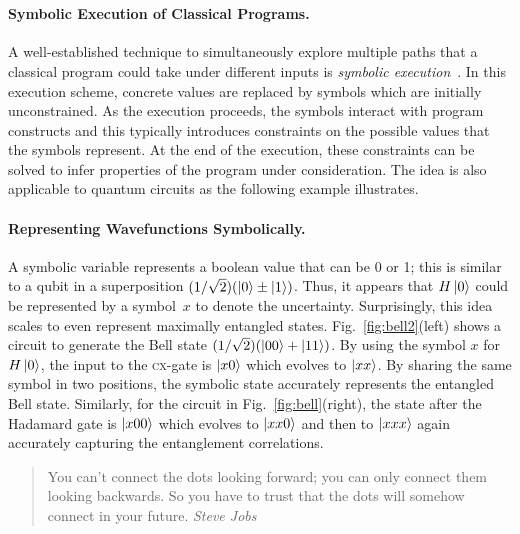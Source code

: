 \documentclass{article}
\newcommand{\cx}{\textsc{cx}}
\begin{document}
\begin{refsection}
{\[\begin{array}{l}
\end{array}\]
}

\paragraph*{Symbolic Execution of Classical Programs.}
A well-established technique to simultaneously explore multiple paths
that a classical program could take under different inputs is
\emph{symbolic
  execution}~\cite{10.1145/390016.808445,10.1145/360248.360252,howden,10.1145/800191.805647,10.1145/3182657}. In
this execution scheme, concrete values are replaced by symbols which are
initially unconstrained. As the execution proceeds, the symbols
interact with program constructs and this typically introduces
constraints on the possible values that the symbols represent. At the
end of the execution, these constraints can be solved to infer
properties of the program under consideration. The idea is also
applicable to quantum circuits as the following example illustrates.

\paragraph*{Representing Wavefunctions Symbolically.}
A symbolic variable represents a boolean value that can be 0 or 1;
this is similar to a qubit in a superposition $(1/\sqrt{2}) (\ket{0}
\pm \ket{1})$. Thus, it appears that $H\ket{0}$ could be represented
by a symbol~$x$ to denote the uncertainty. Surprisingly, this idea
scales to even represent maximally entangled
states. Fig.~\ref{fig:bell2}(left) shows a circuit to generate the Bell
state $(1/\sqrt{2}) (\ket{00} + \ket{11})$. By using the symbol $x$
for $H\ket{0}$, the input to the \cx-gate is $\ket{x0}$ which
evolves to $\ket{xx}$. By sharing the same symbol in two positions,
the symbolic state accurately represents the entangled Bell
state. Similarly, for the circuit in Fig.~\ref{fig:bell}(right), the
state after the Hadamard gate is $\ket{x00}$ which evolves to
$\ket{xx0}$ and then to $\ket{xxx}$ again accurately capturing the
entanglement correlations.

\begin{quote}
You can’t connect the dots looking forward; you can only connect them
looking backwards.  So you have to trust that the dots will somehow
connect in your future. \emph{Steve Jobs}
\end{quote}


\end{refsection}
\end{document}
